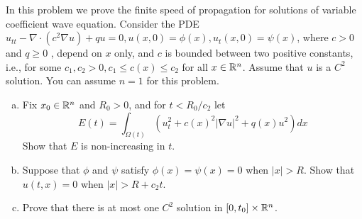 \documentclass{article}
\newcommand{\D}{\nabla}
\begin{document}
\newpage
{} In this problem we prove the finite speed of propagation for solutions of variable coefficient wave equation. Consider the PDE $u_{tt} - \D \cdot (c^2\D u) + qu = 0, u(x,0) = \phi(x), u_t(x,0) = \psi(x)$,
where $c > 0$ and $q  \ge 0$ , depend on $x$ only, and $c$ is bounded between two positive constants, i.e., for
some $c_1,c_2 > 0, c_1 \le c(x) \le c_2$ for all $x \in \mathbb{R}^n$. Assume that $u$ is a $C^2$ solution. You can assume $n= 1$ for this problem.
\begin{enumerate}[(a)]
    \item  Fix $x_0 \in \mathbb{R}^n$ and $R_0 > 0$, and for $t < R_0/c_2$ let
    \[E(t) =\int_{\Omega(t)}(u_t^2 + c(x)^2|\D u |^2 + q(x)u^2) dx\]
    Show that $E$ is non-increasing in $t$. 
    \item Suppose that $\phi$ and $\psi$ satisfy $\phi(x) = \psi(x) = 0$ when $|x| > R$. Show that $u(t,x) = 0$ when
    $|x|> R + c_2t$.
    \item Prove that there is at most one $C^2$ solution in $[0,t_0] \times \mathbb{R}^n$.
\end{enumerate}
\tri
\hop
\solution
\end{document}
